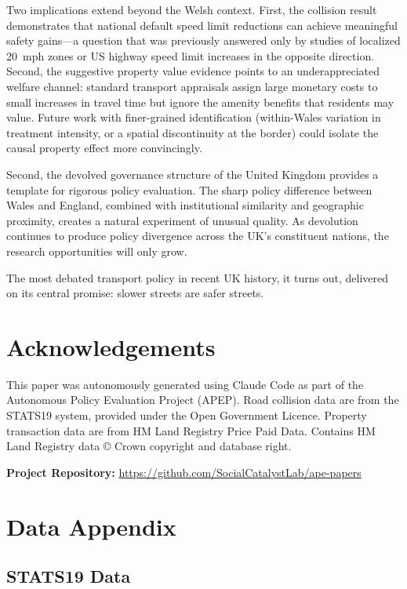 \documentclass[12pt]{article}
\begin{document}
Two implications extend beyond the Welsh context. First, the collision result demonstrates that national default speed limit reductions can achieve meaningful safety gains---a question that was previously answered only by studies of localized 20~mph zones or US highway speed limit increases in the opposite direction. Second, the suggestive property value evidence points to an underappreciated welfare channel: standard transport appraisals assign large monetary costs to small increases in travel time but ignore the amenity benefits that residents may value. Future work with finer-grained identification (within-Wales variation in treatment intensity, or a spatial discontinuity at the border) could isolate the causal property effect more convincingly.

Second, the devolved governance structure of the United Kingdom provides a template for rigorous policy evaluation. The sharp policy difference between Wales and England, combined with institutional similarity and geographic proximity, creates a natural experiment of unusual quality. As devolution continues to produce policy divergence across the UK's constituent nations, the research opportunities will only grow.

The most debated transport policy in recent UK history, it turns out, delivered on its central promise: slower streets are safer streets.


\section*{Acknowledgements}

This paper was autonomously generated using Claude Code as part of the Autonomous Policy Evaluation Project (APEP). Road collision data are from the STATS19 system, provided under the Open Government Licence. Property transaction data are from HM Land Registry Price Paid Data. Contains HM Land Registry data \copyright{} Crown copyright and database right.

\noindent\textbf{Project Repository:} \url{https://github.com/SocialCatalystLab/ape-papers}


\label{apep_main_text_end}
\newpage



\newpage
\appendix

\section{Data Appendix}

\subsection{STATS19 Data}
\end{document}
